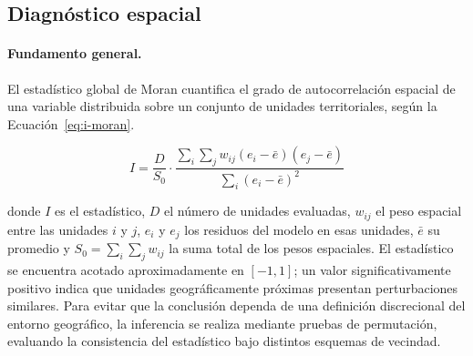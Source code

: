 \subsection{Diagnóstico espacial}
\label{subsec:moran}

\paragraph{Fundamento general.}
El estadístico global de Moran \cite{Moran_1950, Anselin_1988} cuantifica el grado de autocorrelación espacial de una variable distribuida sobre un conjunto de unidades territoriales, según la Ecuación~\ref{eq:i-moran}.

\begin{equation}
    I = \frac{D}{S_0} \cdot \frac{\sum_i \sum_j w_{ij}(e_i - \bar{e})(e_j - \bar{e})}{\sum_i (e_i - \bar{e})^2}
    \label{eq:i-moran}
\end{equation}

\noindent donde $I$ es el estadístico, $D$ el número de unidades evaluadas, $w_{ij}$ el peso espacial entre las unidades $i$ y $j$, $e_i$ y $e_j$ los residuos del modelo en esas unidades, $\bar{e}$ su promedio y $S_0=\sum_i\sum_j w_{ij}$ la suma total de los pesos espaciales. El estadístico se encuentra acotado aproximadamente en $[-1,1]$; un valor significativamente positivo indica que unidades geográficamente próximas presentan perturbaciones similares. Para evitar que la conclusión dependa de una definición discrecional del entorno geográfico, la inferencia se realiza mediante pruebas de permutación, evaluando la consistencia del estadístico bajo distintos esquemas de vecindad.

